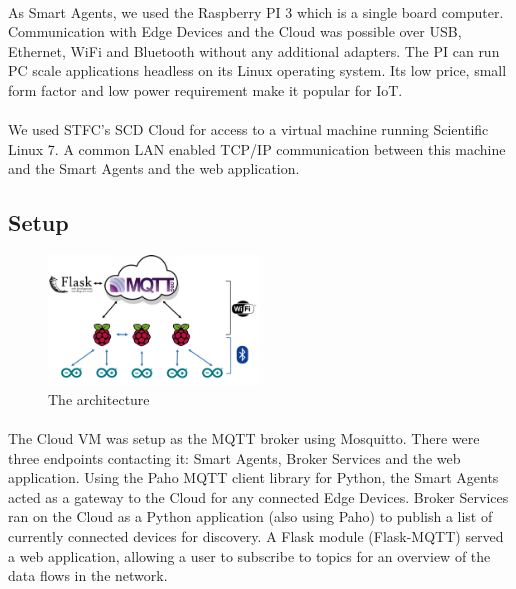 \paragraph{}
As Smart Agents, we used the Raspberry PI 3 which is a single board computer. Communication with Edge Devices and the Cloud was possible over USB, Ethernet, WiFi and Bluetooth without any additional adapters. The PI can run PC scale applications headless on its Linux operating system. Its low price, small form factor and low power requirement make it popular for IoT.

\paragraph{}
We used STFC's SCD Cloud for access to a virtual machine running Scientific Linux 7. A common LAN enabled TCP/IP communication between this machine and the Smart Agents and the web application.


\subsection{Setup}

\begin{figure}
    \centering
    \includegraphics[width=0.5\textwidth]{Architecture.png}
    \caption{The architecture}
    \label{fig:architecture}
\end{figure}

\paragraph{}
The Cloud VM was setup as the MQTT broker using Mosquitto. There were three endpoints contacting it: Smart Agents, Broker Services and the web application. Using the Paho MQTT client library for Python, the Smart Agents acted as a gateway to the Cloud for any connected Edge Devices. Broker Services ran on the Cloud as a Python application (also using Paho) to publish a list of currently connected devices for discovery. A Flask module (Flask-MQTT) served a web application, allowing a user to subscribe to topics for an overview of the data flows in the network.

